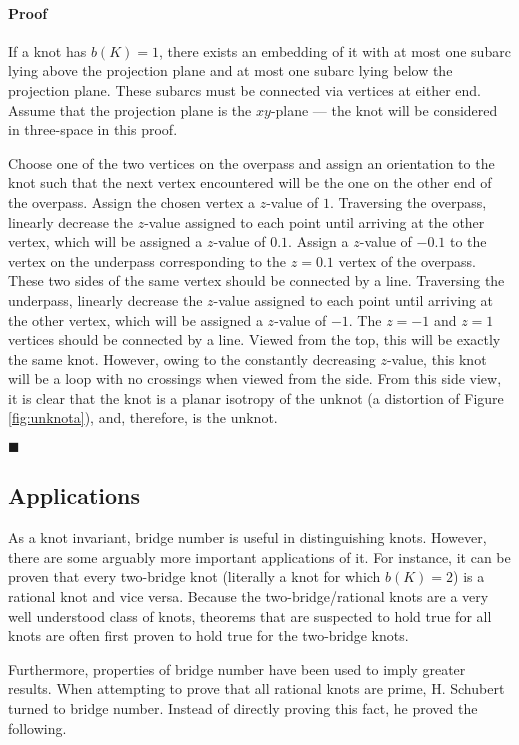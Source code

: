 \documentclass[titlepage]{article}
\newcommand{\qed}{
    \begin{flushright}
        $\blacksquare$
    \end{flushright}
}
\begin{document}
\paragraph{Proof} If a knot has $b(K)=1$, there exists an embedding of it with at most one subarc lying above the projection plane and at most one subarc lying below the projection plane. These subarcs must be connected via vertices at either end. Assume that the projection plane is the $xy$-plane --- the knot will be considered in three-space in this proof.\par
Choose one of the two vertices on the overpass and assign an orientation to the knot such that the next vertex encountered will be the one on the other end of the overpass. Assign the chosen vertex a $z$-value of $1$. Traversing the overpass, linearly decrease the $z$-value assigned to each point until arriving at the other vertex, which will be assigned a $z$-value of $0.1$. Assign a $z$-value of $-0.1$ to the vertex on the underpass corresponding to the $z=0.1$ vertex of the overpass. These two sides of the same vertex should be connected by a line. Traversing the underpass, linearly decrease the $z$-value assigned to each point until arriving at the other vertex, which will be assigned a $z$-value of $-1$. The $z=-1$ and $z=1$ vertices should be connected by a line. Viewed from the top, this will be exactly the same knot. However, owing to the constantly decreasing $z$-value, this knot will be a loop with no crossings when viewed from the side. From this side view, it is clear that the knot is a planar isotropy of the unknot (a distortion of Figure \ref{fig:unknota}), and, therefore, is the unknot.
\qed


\subsection{Applications}\label{sss:applications}
As a knot invariant, bridge number is useful in distinguishing knots. However, there are some arguably more important applications of it. For instance, it can be proven that every two-bridge knot (literally a knot for which $b(K)=2$) is a rational knot and vice versa. Because the two-bridge/rational knots are a very well understood class of knots, theorems that are suspected to hold true for all knots are often first proven to hold true for the two-bridge knots.\par
Furthermore, properties of bridge number have been used to imply greater results. When attempting to prove that all rational knots are prime, H. Schubert turned to bridge number. Instead of directly proving this fact, he proved the following.
\end{document}
